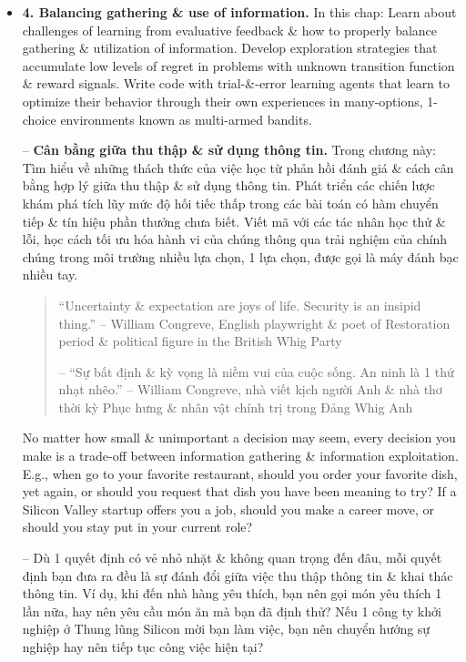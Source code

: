 \documentclass{article}
\begin{document}
\begin{itemize}
\begin{itemize}
\begin{itemize}
        \end{itemize}
    \end{itemize}
    \item {\bf4. Balancing gathering \& use of information.} In this chap: Learn about challenges of learning from evaluative feedback \& how to properly balance gathering \& utilization of information. Develop exploration strategies that accumulate low levels of regret in problems with unknown transition function \& reward signals. Write code with trial-\&-error learning agents that learn to optimize their behavior through their own experiences in many-options, 1-choice environments known as multi-armed bandits.

    -- {\bf Cân bằng giữa thu thập \& sử dụng thông tin.} Trong chương này: Tìm hiểu về những thách thức của việc học từ phản hồi đánh giá \& cách cân bằng hợp lý giữa thu thập \& sử dụng thông tin. Phát triển các chiến lược khám phá tích lũy mức độ hối tiếc thấp trong các bài toán có hàm chuyển tiếp \& tín hiệu phần thưởng chưa biết. Viết mã với các tác nhân học thử \& lỗi, học cách tối ưu hóa hành vi của chúng thông qua trải nghiệm của chính chúng trong môi trường nhiều lựa chọn, 1 lựa chọn, được gọi là máy đánh bạc nhiều tay.
    \begin{quote}
        ``Uncertainty \& expectation are joys of life. Security is an insipid thing.'' -- {\sc William Congreve}, English playwright \& poet of Restoration period \& political figure in the British Whig Party

        -- ``Sự bất định \& kỳ vọng là niềm vui của cuộc sống. An ninh là 1 thứ nhạt nhẽo.'' -- {\sc William Congreve}, nhà viết kịch người Anh \& nhà thơ thời kỳ Phục hưng \& nhân vật chính trị trong Đảng Whig Anh
    \end{quote}
    No matter how small \& unimportant a decision may seem, every decision you make is a trade-off between information gathering \& information exploitation. E.g., when go to your favorite restaurant, should you order your favorite dish, yet again, or should you request that dish you have been meaning to try? If a Silicon Valley startup offers you a job, should you make a career move, or should you stay put in your current role?

    -- Dù 1 quyết định có vẻ nhỏ nhặt \& không quan trọng đến đâu, mỗi quyết định bạn đưa ra đều là sự đánh đổi giữa việc thu thập thông tin \& khai thác thông tin. Ví dụ, khi đến nhà hàng yêu thích, bạn nên gọi món yêu thích 1 lần nữa, hay nên yêu cầu món ăn mà bạn đã định thử? Nếu 1 công ty khởi nghiệp ở Thung lũng Silicon mời bạn làm việc, bạn nên chuyển hướng sự nghiệp hay nên tiếp tục công việc hiện tại?


\end{itemize}
\end{document}

